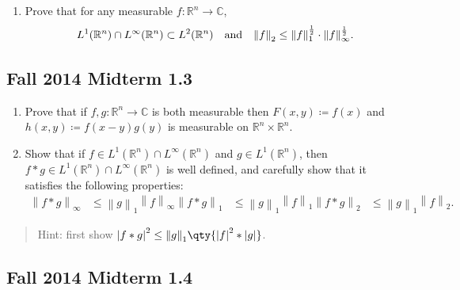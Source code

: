 \begin{enumerate}
\def\labelenumi{\alph{enumi}.}
\setcounter{enumi}{1}
\tightlist
\item
  Prove that for any measurable \(f:{\mathbb{R}}^n \to {\mathbb{C}}\),
  \begin{align*}
  L^1({\mathbb{R}}^n) \cap L^\infty({\mathbb{R}}^n) \subset L^2({\mathbb{R}}^n) {\quad \operatorname{and} \quad} {\left\lVert {f} \right\rVert}_2 \leq {\left\lVert {f} \right\rVert}_1^{1\over 2} \cdot {\left\lVert {f} \right\rVert}_\infty^{1\over 2}
  .\end{align*}
\end{enumerate}

\hypertarget{fall-2014-midterm-1.3}{%
\subsection{Fall 2014 Midterm 1.3}\label{fall-2014-midterm-1.3}}

\begin{enumerate}
\def\labelenumi{\alph{enumi}.}
\item
  Prove that if \(f, g: {\mathbb{R}}^n\to {\mathbb{C}}\) is both
  measurable then \(F(x, y) \coloneqq f(x)\) and
  \(h(x, y)\coloneqq f(x-y) g(y)\) is measurable on
  \({\mathbb{R}}^n\times{\mathbb{R}}^n\).
\item
  Show that if
  \(f\in L^1({\mathbb{R}}^n) \cap L^\infty({\mathbb{R}}^n)\) and
  \(g\in L^1({\mathbb{R}}^n)\), then
  \(f\ast g \in L^1({\mathbb{R}}^n) \cap L^\infty({\mathbb{R}}^n)\) is
  well defined, and carefully show that it satisfies the following
  properties:
  \begin{align*}
  {\left\lVert {f\ast g} \right\rVert}_\infty &\leq {\left\lVert {g} \right\rVert}_1 {\left\lVert {f} \right\rVert}_\infty
  {\left\lVert {f\ast g} \right\rVert}_1      &\leq {\left\lVert {g} \right\rVert}_1 {\left\lVert {f} \right\rVert}_1
  {\left\lVert {f\ast g} \right\rVert}_2      &\leq {\left\lVert {g} \right\rVert}_1 {\left\lVert {f} \right\rVert}_2
  .\end{align*}
\end{enumerate}

\begin{quote}
Hint: first show
\({\left\lvert {f\ast g} \right\rvert}^2 \leq {\left\lVert {g} \right\rVert}_1 \qty{ {\left\lvert {f} \right\rvert}^2 \ast {\left\lvert {g} \right\rvert}}\).
\end{quote}

\hypertarget{fall-2014-midterm-1.4}{%
\subsection{Fall 2014 Midterm 1.4}\label{fall-2014-midterm-1.4}}

